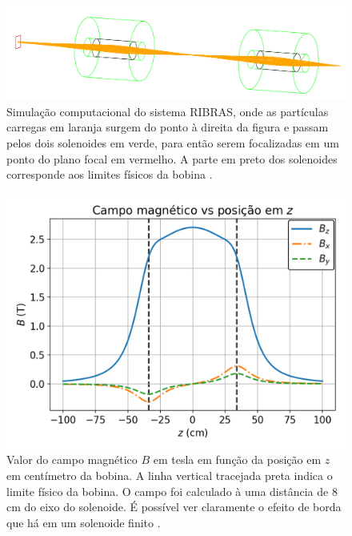 \documentclass[a4paper,12pt,oneside]{book}
\begin{document}

\begin{figure}[H]
    \centering
    \includegraphics[scale = 0.95]{figs/Foco2S.png}
    \caption{Simulação computacional do sistema RIBRAS, onde as partículas carregas em laranja surgem do ponto à direita da figura e passam pelos dois solenoides em verde, para então serem focalizadas em um ponto do plano focal em vermelho. A parte em preto dos solenoides corresponde aos limites físicos da bobina \cite{ribras_leo}.}
    \label{fig:sim_ribras}
\end{figure}

\begin{figure}[H]
    \centering
    \includegraphics[scale = 0.85]{figs/Campo_mag.png}
    \caption{Valor do campo magnético $B$ em tesla em função da posição em $z$ em centímetro da bobina. A linha vertical tracejada preta indica o limite físico da bobina. O campo foi calculado à uma distância de 8 cm do eixo do solenoide. É possível ver claramente o efeito de borda que há em um solenoide finito \cite{magnetic_field}.}
    \label{fig:campo_mag}
\end{figure}
\end{document}
